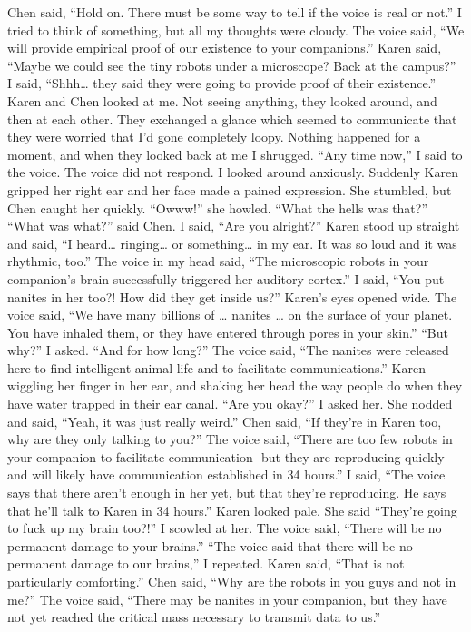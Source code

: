 \documentclass[a4paper]{article}
\begin{document}
Chen said, “Hold on. There must be some way to tell if the voice is real or not.”
I tried to think of something, but all my thoughts were cloudy.
The voice said, “We will provide empirical proof of our existence to your companions.”
Karen said, “Maybe we could see the tiny robots under a microscope? Back at the campus?”
I said, “Shhh… they said they were going to provide proof of their existence.”
Karen and Chen looked at me. Not seeing anything, they looked around, and then at each other. They exchanged a glance which seemed to communicate that they were worried that I’d gone completely loopy.
Nothing happened for a moment, and when they looked back at me I shrugged. “Any time now,” I said to the voice.
The voice did not respond. I looked around anxiously.
Suddenly Karen gripped her right ear and her face made a pained expression. She stumbled, but Chen caught her quickly. “Owww!” she howled. “What the hells was that?”
“What was what?” said Chen.
I said, “Are you alright?”
Karen stood up straight and said, “I heard… ringing… or something… in my ear. It was so loud and it was rhythmic, too.”
The voice in my head said, “The microscopic robots in your companion’s brain successfully triggered her auditory cortex.”
I said, “You put nanites in her too?! How did they get inside us?”
Karen’s eyes opened wide.
The voice said, “We have many billions of … nanites … on the surface of your planet. You have inhaled them, or they have entered through pores in your skin.”
“But why?” I asked. “And for how long?”
The voice said, “The nanites were released here to find intelligent animal life and to facilitate communications.”
Karen wiggling her finger in her ear, and shaking her head the way people do when they have water trapped in their ear canal. “Are you okay?” I asked her.
She nodded and said, “Yeah, it was just really weird.”
Chen said, “If they’re in Karen too, why are they only talking to you?”
The voice said, “There are too few robots in your companion to facilitate communication- but they are reproducing quickly and will likely have communication established in 34 hours.”
I said, “The voice says that there aren’t enough in her yet, but that they’re reproducing. He says that he’ll talk to Karen in 34 hours.”
Karen looked pale. She said “They’re going to fuck up my brain too?!”
I scowled at her.
The voice said, “There will be no permanent damage to your brains.”
“The voice said that there will be no permanent damage to our brains,” I repeated.
Karen said, “That is not particularly comforting.”
Chen said, “Why are the robots in you guys and not in me?”
The voice said, “There may be nanites in your companion, but they have not yet reached the critical mass necessary to transmit data to us.”
\end{document}
